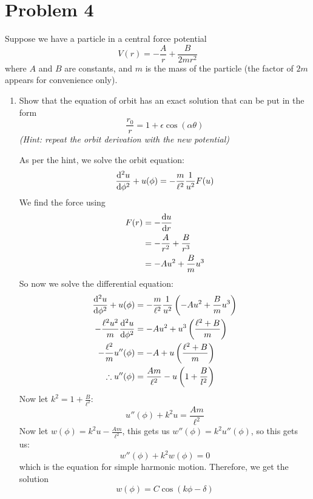 \documentclass[10pt]{article}
\begin{document}
	\pagebreak

	\section*{Problem 4}
	Suppose we have a particle in a central force potential
	\[ V(r) = -\frac{A}{r} + \frac{B}{2mr^2}\]
	where $A$ and $B$ are constants, and $m$ is the mass of the particle (the factor of $2m$ appears for 
	convenience only). 
	\begin{enumerate}[label=\alph*)]
			\item Show that the equation of orbit has an exact solution that can be put in the form 
					\[ \frac{r_0}{r} = 1 + \epsilon \cos (\alpha \theta)\]
					\textit{(Hint: repeat the orbit derivation with the new potential)}

					\begin{solution}
							As per the hint, we solve the orbit equation:
							\[
									\dv[2]{u}{\phi} + u(\phi) = -\frac{m}{\ell^2} \frac{1}{u^2}F(u)
							\] 
							We find the force using 
							\begin{align*}
									F(r) &= -\dv{u}{r}\\
									&= -\frac{A}{r^2} + \frac{B}{r^3} \\
									&= -Au^2 + \frac{B}{m}u^3 \\
							\end{align*}
							So now we solve the differential equation: 
							\begin{align*}
									\dv[2]{u}{\phi} + u(\phi) &= -\frac{m}{\ell^2}\frac{1}{u^2}\left(-Au^2 +
									\frac{B}{m}u^3\right) \\
									-\frac{\ell^2u^2}{m}\dv[2]{u}{\phi} &= -Au^2 +
									u^3\left( \frac{\ell^2 + B}{m} \right) \\	
									-\frac{\ell^2}{m}u''(\phi) &= -A + u\left( \frac{\ell^2 + B}{m} \right) \\
									\therefore u''(\phi) &= \frac{Am}{\ell^2} - u\left( 1 +
									\frac{B}{l^2} \right)  \\
							\end{align*}
							Now let $k^2 = 1 + \frac{B}{\ell^2}$:
							\[
								u''(\phi) + k^2 u = \frac{Am}{\ell^2}
							\] 
							Now let $w(\phi) = k^2u -\frac{Am}{\ell^2}$, this gets us $w''(\phi) = k^2u''(\phi)$,
							so this gets us: 
							\[
							w''(\phi) + k^2w(\phi) = 0
							\] 
							which is the equation for simple harmonic motion. Therefore, we get the solution 
							\[
							w(\phi) = C\cos(k\phi-\delta)
							\] 

\end{solution}
\end{enumerate}
\end{document}
